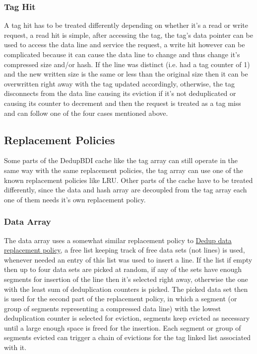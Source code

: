 \subsubsection{Tag Hit}
A tag hit has to be treated differently depending on whether it's a read or write request, a read hit is simple, after accessing the tag, the tag's data pointer can be used to access the data line and service the request, a write hit however can be complicated because it can cause the data line to change and thus change it's compressed size and/or hash. If the line was distinct (i.e. had a tag counter of 1) and the new written size is the same or less than the original size then it can be overwritten right away with the tag updated accordingly, otherwise, the tag disconnects from the data line causing its eviction if it's not deduplicated or causing its counter to decrement and then the request is treated as a tag miss and can follow one of the four cases mentioned above.

\subsection{Replacement Policies}
\label{ssec:Replacement Policies}
Some parts of the DedupBDI cache like the tag array can still operate in the same way with the same replacement policies, the tag array can use one of the known replacement policies like LRU. Other parts of the cache have to be treated differently, since the data and hash array are decoupled from the tag array each one of them needs it's own replacement policy.
\subsubsection{Data Array}
\label{sssec:DedupBDIData}
The data array uses a somewhat similar replacement policy to \hyperref[sssec:DedupDataRepl]{Dedup data replacement policy}, a free list keeping track of free data sets (not lines) is used, whenever needed an entry of this list was used to insert a line. If the list if empty then up to four data sets are picked at random, if any of the sets have enough segments for insertion of the line then it's selected right away, otherwise the one with the least sum of deduplication counters is picked. The picked data set then is used for the second part of the replacement policy, in which a segment (or group of segments representing a compressed data line) with the lowest deduplication counter is selected for eviction, segments keep evicted as necessary until a large enough space is freed for the insertion. Each segment or group of segments evicted can trigger a chain of evictions for the tag linked list associated with it.
